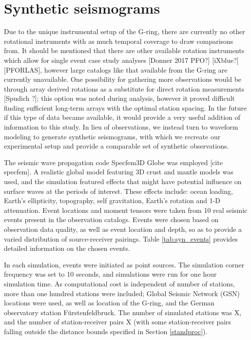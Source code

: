\documentclass{gji}
\begin{document}
\section{Synthetic seismograms}
Due to the unique instrumental setup of the G-ring, there are currently no other rotational instruments with as much temporal coverage to draw comparisons from. It should be mentioned that there are other available rotation instruments which allow for single event case study analyses [Donner 2017 PFO?] [iXblue?] [PFORLAS], however large catalogs like that available from the G-ring are currently unavailable. One possibility for gathering more observations would be through array derived rotations as a substitute for direct rotation measurements [Spudich ?]; this option was noted during analysis, however it proved difficult finding sufficient long-term arrays with the optimal station spacing. In the future if this type of data became available, it would provide a very useful addition of information to this study. In lieu of observations, we instead turn to waveform modeling to generate synthetic seismograms, with which we recreate our experimental setup and provide a comparable set of synthetic observations.

The seismic wave propagation code Specfem3D Globe was employed [cite specfem]. A realistic global model featuring 3D crust and mantle models was used, and the simulation featured effects that might have potential influence on surface waves at the periods of interest. These effects include: ocean loading, Earth's ellipticity, topography, self gravitation, Earth's rotation and 1-D attenuation. Event locations and moment tensors were taken from 10 real seismic events present in the observation catalogs. Events were chosen based on observation data quality, as well as event location and depth, so as to provide a varied distribution of source-receiver pairings. Table \ref{tab:syn_events} provides detailed information on the chosen events. 

In each simulation, events were initiated as point sources. The simulation corner frequency was set to 10 seconds, and simulations were run for one hour simulation time. As computational cost is independent of number of stations, more than one hundred stations were included; Global Seismic Network (GSN) locations were used, as well as location of the G-ring, and the German observatory station F\"urstenfeldbruck. The number of simulated stations was X, and the number of station-receiver pairs X (with some station-receiver pairs falling outside the distance bounds specified in Section \ref{standproc}).
\end{document}
